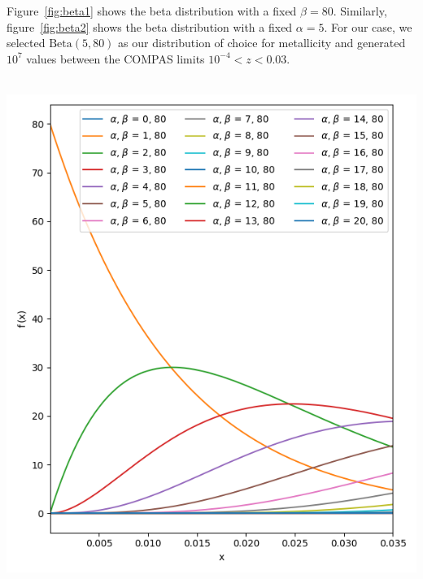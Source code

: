 Figure~\ref{fig:beta1} shows the beta distribution with a fixed $\beta=80$.
Similarly, figure~\ref{fig:beta2} shows the beta distribution with a fixed $\alpha=5$.
For our case, we selected $\text{Beta}(5, 80)$ as our distribution of choice for metallicity and generated $10^7$ values between the COMPAS limits $10^{-4} < z < 0.03$.
\,\\\,\\
\begin{minipage}[l]{0.48\columnwidth}
    \centering
    \includegraphics[width=\linewidth]{analysis_data/004__images_for_latex/beta1}
    \label{fig:beta1}
\end{minipage}
\hfill

